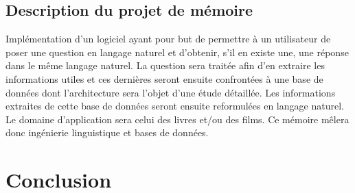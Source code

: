 \documentclass[11pt]{article}
\begin{document}
\subsection{Description du projet de mémoire}
Implémentation d’un logiciel ayant pour but de permettre  à un utilisateur de poser une question en langage naturel et d’obtenir, s’il en existe une, une réponse dans le même langage naturel. La question sera traitée afin d’en extraire les informations utiles et ces dernières seront ensuite confrontées à une base de données dont l’architecture sera l’objet d’une étude détaillée. Les informations extraites de cette base de données seront ensuite reformulées en langage naturel. Le domaine d’application sera celui des livres et/ou des films. Ce mémoire mêlera donc ingénierie linguistique et bases de données.

\section{Conclusion}

\newpage
\nocite{*}
\printbibliography
\end{document}
